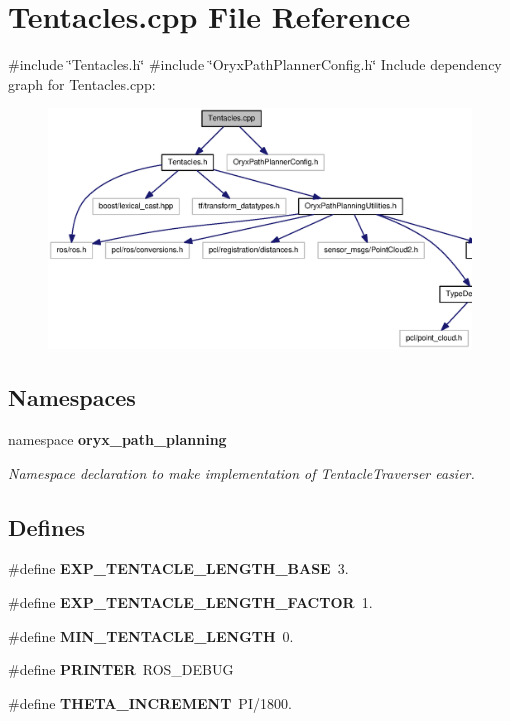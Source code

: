 \section{\-Tentacles.\-cpp \-File \-Reference}
\label{Tentacles_8cpp}
{\ttfamily \#include \char`\"{}\-Tentacles.\-h\char`\"{}}\*
{\ttfamily \#include \char`\"{}\-Oryx\-Path\-Planner\-Config.\-h\char`\"{}}\*
\-Include dependency graph for \-Tentacles.\-cpp\-:
\nopagebreak
\begin{figure}[H]
\begin{center}
\leavevmode
\includegraphics[width=350pt]{Tentacles_8cpp__incl}
\end{center}
\end{figure}
\subsection*{\-Namespaces}
\begin{DoxyCompactItemize}
\item 
namespace {\bf oryx\-\_\-path\-\_\-planning}
\begin{DoxyCompactList}\small\item\em \-Namespace declaration to make implementation of \-Tentacle\-Traverser easier. \end{DoxyCompactList}\end{DoxyCompactItemize}
\subsection*{\-Defines}
\begin{DoxyCompactItemize}
\item 
\#define {\bf \-E\-X\-P\-\_\-\-T\-E\-N\-T\-A\-C\-L\-E\-\_\-\-L\-E\-N\-G\-T\-H\-\_\-\-B\-A\-S\-E}~3.
\item 
\#define {\bf \-E\-X\-P\-\_\-\-T\-E\-N\-T\-A\-C\-L\-E\-\_\-\-L\-E\-N\-G\-T\-H\-\_\-\-F\-A\-C\-T\-O\-R}~1.
\item 
\#define {\bf \-M\-I\-N\-\_\-\-T\-E\-N\-T\-A\-C\-L\-E\-\_\-\-L\-E\-N\-G\-T\-H}~0.
\item 
\#define {\bf \-P\-R\-I\-N\-T\-E\-R}~\-R\-O\-S\-\_\-\-D\-E\-B\-U\-G
\item 
\#define {\bf \-T\-H\-E\-T\-A\-\_\-\-I\-N\-C\-R\-E\-M\-E\-N\-T}~\-P\-I/1800.
\end{DoxyCompactItemize}
